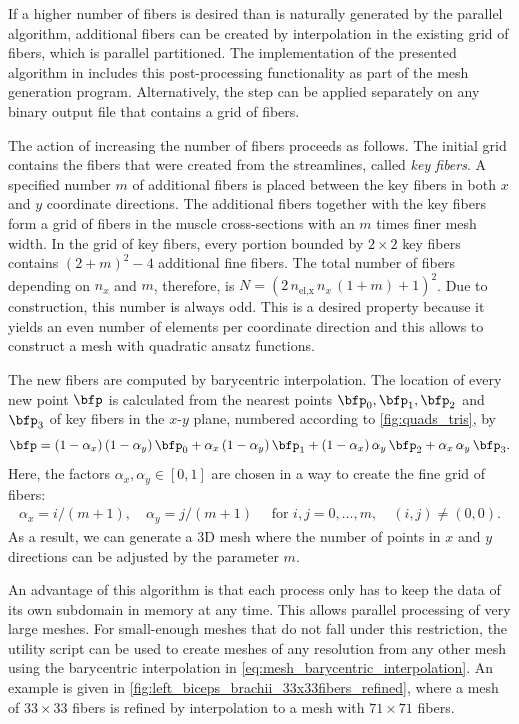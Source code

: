 If a higher number of fibers is desired than is naturally generated by the parallel algorithm, additional fibers can be created by interpolation in the existing grid of fibers, which is parallel partitioned. The implementation of the presented algorithm in \opendihu{} includes this post-processing functionality as part of the mesh generation program. Alternatively, the step can be applied separately on any binary output file that contains a grid of fibers. 

The action of increasing the number of fibers proceeds as follows. The initial grid contains the fibers that were created from the streamlines, called \emph{key fibers}.
A specified number $m$ of additional fibers is placed between the key fibers in both $x$ and $y$ coordinate directions.
The additional fibers together with the key fibers form a grid of fibers in the muscle cross-sections with an $m$ times finer mesh width. In the grid of key fibers, every portion bounded by $2 \times 2$ key fibers contains $(2+m)^2 - 4$ additional fine fibers. The total number of fibers depending on $n_x$ and $m$, therefore, is $N=(2\,n_\text{el,x}\,n_x\,(1+m)+1)^2$. Due to construction, this number is always odd. This is a desired property because it yields an even number of elements per coordinate direction and this allows to construct a mesh with quadratic ansatz functions.

The new fibers are computed by barycentric interpolation. The location of every new point $\bfp$ is calculated from the nearest points $\bfp_0, \bfp_1, \bfp_2$ and $\bfp_3$ of key fibers in the $x$-$y$ plane, numbered according to  \cref{fig:quads_tris}, by%
\begin{align}\label{eq:mesh_barycentric_interpolation}
  \bfp = (1-\alpha_x)\,(1-\alpha_y)\,\bfp_0 + \alpha_x\,(1-\alpha_y)\,\bfp_1 
        + (1-\alpha_x)\,\alpha_y\,\bfp_2 + \alpha_x\,\alpha_y\,\bfp_3.
\end{align}
Here, the factors $\alpha_x,\alpha_y \in [0,1]$ are chosen in a way to create the fine grid of fibers:
%
\begin{align*}
  \alpha_x = i / (m+1), \quad \alpha_y = j / (m+1)\quad \text{ for }i,j = 0, \dots,m, \quad (i,j) \neq (0,0).
\end{align*}
As a result, we can generate a 3D mesh where the number of points in $x$ and $y$ directions can be adjusted by the parameter $m$. 

An advantage of this algorithm is that each process only has to keep the data of its own subdomain in memory at any time. This allows parallel processing of very large meshes. For small-enough meshes that do not fall under this restriction, the utility script  can be used to create meshes of any resolution from any other mesh using the barycentric interpolation in \cref{eq:mesh_barycentric_interpolation}. An example is given in \cref{fig:left_biceps_brachii_33x33fibers_refined}, where a mesh of  $33\times 33$ fibers is refined by interpolation to a mesh with $71\times 71$ fibers.

